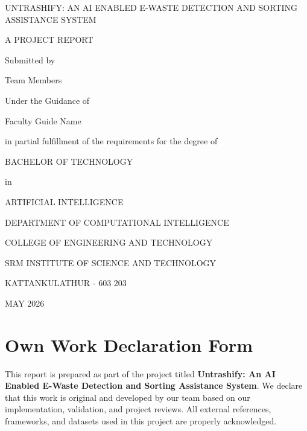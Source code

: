 \documentclass[12pt,a4paper]{report}
\begin{document}
\begin{titlepage}
    \centering
    \vspace*{1cm}
    {\Large UNTRASHIFY: AN AI ENABLED E-WASTE DETECTION AND SORTING ASSISTANCE SYSTEM\par}
    \vspace{0.8cm}
    {\large A PROJECT REPORT\par}
    \vspace{0.8cm}
    {\large Submitted by\par}
    \vspace{0.4cm}
    {\large Team Members\par}
    \vspace{0.5cm}
    {\normalsize Under the Guidance of\par}
    \vspace{0.3cm}
    {\normalsize Faculty Guide Name\par}
    \vspace{0.8cm}
    {\normalsize in partial fulfillment of the requirements for the degree of\par}
    \vspace{0.4cm}
    {\large BACHELOR OF TECHNOLOGY\par}
    \vspace{0.2cm}
    {\large in\par}
    \vspace{0.2cm}
    {\large ARTIFICIAL INTELLIGENCE\par}
    \vspace{0.8cm}
    {\normalsize DEPARTMENT OF COMPUTATIONAL INTELLIGENCE\par}
    {\normalsize COLLEGE OF ENGINEERING AND TECHNOLOGY\par}
    {\normalsize SRM INSTITUTE OF SCIENCE AND TECHNOLOGY\par}
    {\normalsize KATTANKULATHUR - 603 203\par}
    \vfill
    {\normalsize MAY 2026\par}
\end{titlepage}


\chapter*{Own Work Declaration Form}
This report is prepared as part of the project titled \textbf{Untrashify: An AI Enabled E-Waste Detection and Sorting Assistance System}. We declare that this work is original and developed by our team based on our implementation, validation, and project reviews. All external references, frameworks, and datasets used in this project are properly acknowledged.
\end{document}
